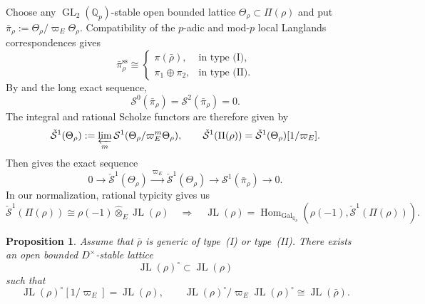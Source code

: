 \documentclass[11pt]{article}
\newtheorem{proposition}[theorem]{Proposition}
\theoremstyle{definition}
\newcommand{\Hom}{\operatorname{Hom}}
\newcommand{\GL}{\operatorname{GL}}
\newcommand{\JL}{\operatorname{JL}}
\begin{document}
Choose any $\GL_2(\mathbb Q_p)$-stable open bounded lattice
$\Theta_\rho\subset\Pi(\rho)$ and put
$\bar\pi_\rho:=\Theta_\rho/\varpi_E\Theta_\rho$.
Compatibility of the $p$-adic and mod-$p$ local Langlands
correspondences \cite[Proposition~III.55 and Remark~III.56]{ColmezDospinescu2014} gives
\[
 \bar\pi_\rho^{\mathrm{ss}}\cong
 \begin{cases}
  \pi(\bar\rho),&\text{in type~(I)},\\
  \pi_1\oplus\pi_2,&\text{in type~(II)}.
 \end{cases}
\]
By \cite[Theorem~4.11]{HuWangPadic} and the long exact sequence,
\[
 \mathcal S^0(\bar\pi_\rho)=\mathcal S^2(\bar\pi_\rho)=0.
\]
The integral and rational Scholze functors are therefore given by
\[
 \check{\mathcal S}^1(\Theta_\rho)
 :=\varprojlim_m\mathcal S^1(\Theta_\rho/\varpi_E^m\Theta_\rho),
\qquad
 \check{\mathcal S}^1(\Pi(\rho))
 =\check{\mathcal S}^1(\Theta_\rho)[1/\varpi_E].
\]
Then \cite[Proposition~4.14]{HuWangPadic} gives the exact sequence
\[
 0\longrightarrow\check{\mathcal S}^1(\Theta_\rho)
 \xrightarrow{\ \varpi_E\ }\check{\mathcal S}^1(\Theta_\rho)
 \longrightarrow\mathcal S^1(\bar\pi_\rho)\longrightarrow0.
\]
In our normalization, rational typicity \cite[Corollary~4.20]{LiuWang2025} gives us
\begin{equation}\label{eq:rational-S-typicity}
 \check{\mathcal S}^1(\Pi(\rho))\cong\rho(-1)\widehat\otimes_E\JL(\rho)\quad\Rightarrow\quad\JL(\rho)=\Hom_{\mathrm{Gal}_{\mathbb{Q}_p}}(\rho(-1), \check{\mathcal S}^1(\Pi(\rho))).
\end{equation}

\begin{proposition}\label{prop:integral-jl-lattice}
Assume that $\bar\rho$ is generic of type~\textup{(I)} or type~\textup{(II)}.  There exists an
open bounded $D^\times$-stable lattice
\[
 \JL(\rho)^\circ\subset\JL(\rho)
\]
such that
\[
 \JL(\rho)^\circ[1/\varpi_E]=\JL(\rho),
 \qquad
 \JL(\rho)^\circ/\varpi_E\JL(\rho)^\circ
 \cong\JL(\bar\rho).
\]
\end{proposition}
\end{document}
